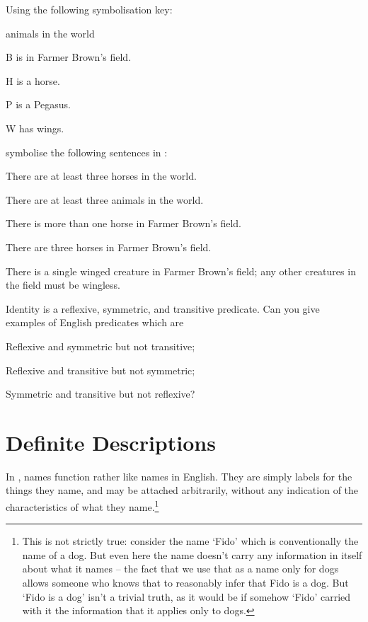 \problempart Using the following symbolisation key:
\begin{ekey}
\item[\text{domain}] animals in the world
\item[B]  is in Farmer Brown's field.
\item[H]  is a horse.
\item[P]  is a Pegasus.
\item[W]  has wings.
\end{ekey}
symbolise the following sentences in \FOL:
\begin{earg}
\item There are at least three horses in the world.
\item There are at least three animals in the world.
\item There is more than one horse in Farmer Brown's field.
\item There are three horses in Farmer Brown's field.
\item There is a single winged creature in Farmer Brown's field; any other creatures in the field must be wingless.
\end{earg}

\problempart
Identity is a reflexive, symmetric, and transitive predicate. Can you give examples of English predicates which are \begin{earg}
	\item Reflexive and symmetric but not transitive;
	\item Reflexive and transitive but not symmetric;
	\item Symmetric and transitive but not reflexive?
\end{earg}


\chapter{Definite Descriptions}\label{subsec.defdesc}

In \FOL, names function rather like names in English. They are simply labels for the things they name, and may be attached arbitrarily, without any indication of the characteristics of what they name.\footnote{This is not strictly true: consider the name `Fido' which is conventionally the name of a dog. But even here the name doesn't carry any information in itself about what it names – the fact that we use that as a name only for dogs allows someone who knows that to reasonably infer that Fido is a dog. But `Fido is a dog' isn't a trivial truth, as it would be if somehow `Fido' carried with it the information that it applies only to dogs.} 

